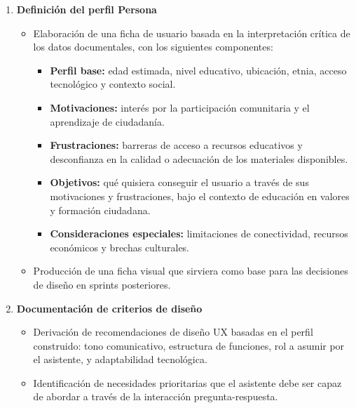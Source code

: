 \begin{enumerate}
      \item \textbf{Definición del perfil Persona}
            \begin{itemize}
                  \item Elaboración de una ficha de usuario basada en la interpretación crítica de los
                        datos documentales, con los siguientes componentes:
                        \begin{itemize}
                              \item \textbf{Perfil base:} edad estimada, nivel educativo, ubicación, etnia, acceso tecnológico y contexto social.
                              \item \textbf{Motivaciones:} interés por la participación comunitaria y el aprendizaje de ciudadanía.
                              \item \textbf{Frustraciones:} barreras de acceso a recursos educativos y desconfianza en la calidad o adecuación de los materiales disponibles.
                              \item \textbf{Objetivos:} qué quisiera conseguir el usuario a través de sus motivaciones y frustraciones, bajo el contexto de educación en valores y formación ciudadana.
                              \item \textbf{Consideraciones especiales:} limitaciones de conectividad, recursos económicos y brechas culturales.
                        \end{itemize}
                  \item Producción de una ficha visual que sirviera como base para las decisiones de
                        diseño en sprints posteriores.
            \end{itemize}

      \item \textbf{Documentación de criterios de diseño}
            \begin{itemize}
                  \item Derivación de recomendaciones de diseño UX basadas en el perfil construido:
                        tono comunicativo, estructura de funciones, rol a asumir por el asistente, y
                        adaptabilidad tecnológica.
                  \item Identificación de necesidades prioritarias que el asistente debe ser capaz de
                        abordar a través de la interacción pregunta-respuesta.
            \end{itemize}

\end{enumerate}


